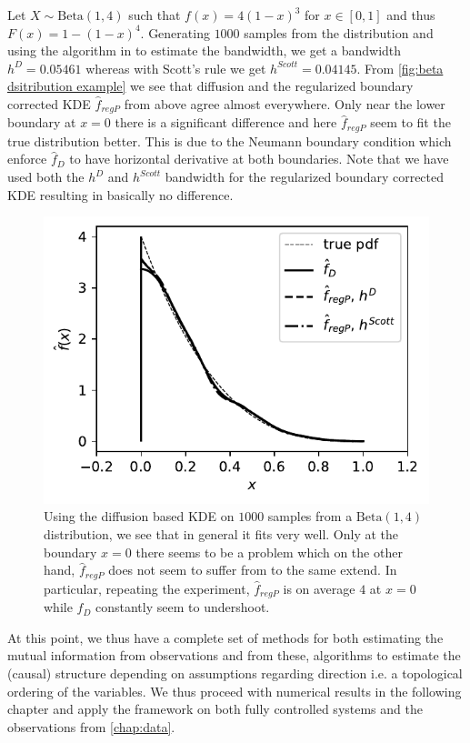 \documentclass[../Thesis.tex]{subfiles}
\begin{document}
\begin{example}
    Let $X\sim \text{Beta} \left(1,4\right)$ such that $f(x) = 4 \left(1- x\right)^3$ for $x\in \left[0,1\right]$ and thus $F\left(x\right) = 1 - (1-x)^4$. Generating $1000$ samples from the distribution and using the algorithm in \cite{Kernel-density-estimation-via-diffusion} to estimate the bandwidth, we get a bandwidth $h^D = 0.05461$ whereas with Scott's rule we get $h ^{Scott} = 0.04145$. From \autoref{fig:beta dsitribution example} we see that diffusion and the regularized boundary corrected KDE $\hat{f}_{regP}$ from above agree almost everywhere. Only near the lower boundary at $x=0$ there is a significant difference and here $\hat{f}_{regP}$ seem to fit the true distribution better. This is due to the Neumann boundary condition which enforce $\hat{f}_D$ to have horizontal derivative at both boundaries. Note that we have used both the $h^D$ and $h^{Scott}$ bandwidth for the regularized boundary corrected KDE resulting in basically no difference.

    \begin{figure}[h]
        \centering
        \includegraphics[width = .7\linewidth]{figures/MI estimation/beta dist example - comparison with diffusion and jones.pdf}
        \caption{Using the diffusion based KDE on $1000$ samples from a $\text{Beta}\left(1,4\right)$ distribution, we see that in general it fits very well. Only at the boundary $x=0$ there seems to be a problem which on the other hand, $\hat{f}_{regP}$ does not seem to suffer from to the same extend. In particular, repeating the experiment, $\hat{f}_{regP}$ is on average $4$ at $x = 0$ while $\hat{f}_{D}$ constantly seem to undershoot.}
        \label{fig:beta dsitribution example}
    \end{figure}
\end{example}
At this point, we thus have a complete set of methods for both estimating the mutual information from observations and from these, algorithms to estimate the (causal) structure depending on assumptions regarding direction i.e. a topological ordering of the variables. We thus proceed with numerical results in the following chapter and apply the framework on both fully controlled systems and the observations from \autoref{chap:data}.
\end{document}

